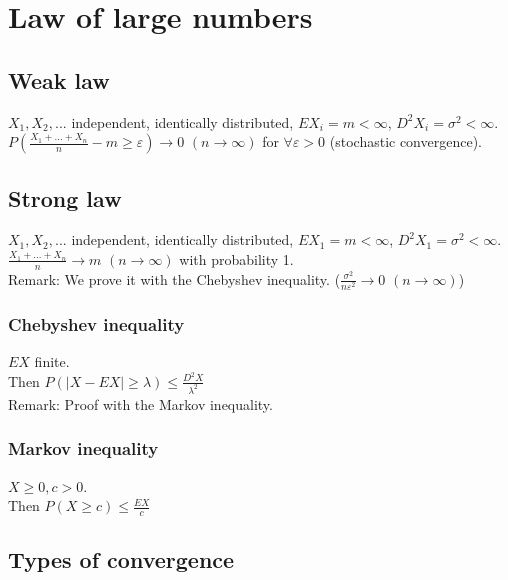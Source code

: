 \documentclass[margin=0px]{article}
\begin{document}
\section{Law of large numbers}

\subsection{Weak law}

$X_1, X_2, ...$ independent, identically distributed, $EX_i = m < \infty$, $D^{2}X_i = \sigma^2 < \infty$. \\
$P(\frac{X_1 + ... + X_n}{n} - m \geq \varepsilon) \rightarrow 0$ $(n \to \infty)$ for $\forall \varepsilon > 0$ (stochastic convergence).

\subsection{Strong law}

$X_1, X_2, ...$ independent, identically distributed, $EX_1 = m < \infty$, $D^{2}X_1 = \sigma^2 < \infty$. \\
$\frac{X_1 + ... + X_n}{n} \rightarrow m$ $(n \to \infty)$ with probability 1. \\
Remark: We prove it with the Chebyshev inequality. ($\frac{\sigma^2}{n \varepsilon^2} \to 0$ $(n \to \infty)$)

\subsubsection{Chebyshev inequality}

$EX$ finite. \\
Then $P(|X-EX| \geq \lambda) \leq \frac{D^{2}X}{\lambda^2}$ \\
Remark: Proof with the Markov inequality.

\subsubsection{Markov inequality}

$X \geq 0, c > 0$. \\
Then $P(X \geq c) \leq \frac{EX}{c}$

\subsection{Types of convergence}
\end{document}

